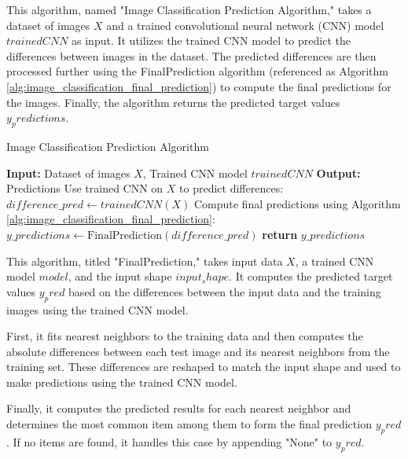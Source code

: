 \documentclass[a4paper, 12pt]{report}
\begin{document}
This algorithm, named "Image Classification Prediction Algorithm," takes a dataset of images $X$ and a trained convolutional neural network 
(CNN) model $trainedCNN$ as input. It utilizes the trained CNN model to predict the differences between images in the dataset. 
The predicted differences are then processed further using the FinalPrediction algorithm (referenced as Algorithm \ref{alg:image_classification_final_prediction}) 
to compute the final predictions for the images. Finally, the algorithm returns the predicted target values $y_predictions$.
\begin{algorithm}
    \caption{Image Classification Prediction Algorithm}
    \label{alg:image_classification_prediction}
    \begin{algorithmic}[1]
            \State \textbf{Input:} Dataset of images $X$, Trained CNN model $trainedCNN$
            \State \textbf{Output:} Predictions 
            \State Use trained CNN on $X$ to predict differences: $difference\_pred \gets trainedCNN(X)$
            \State Compute final predictions using Algorithm \ref{alg:image_classification_final_prediction}: $y\_predictions \gets \text{FinalPrediction}(difference\_pred)$ 
            \State \textbf{return} $y\_predictions$
        \EndFunction
    \end{algorithmic}
\end{algorithm}


This algorithm, titled "FinalPrediction," takes input data $X$, a trained CNN model $model$, and the input shape $input_shape$. 
It computes the predicted target values $y_pred$ based on the differences between the input data and the training images using the trained CNN model.

First, it fits nearest neighbors to the training data and then computes the absolute differences between each test image 
and its nearest neighbors from the training set. These differences are reshaped to match the input shape and used to make predictions using the trained CNN model.

Finally, it computes the predicted results for each nearest neighbor and determines the most common item among them to form the 
final prediction $y_pred$. If no items are found, it handles this case by appending "None" to $y_pred$.
\end{document}
